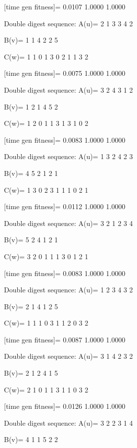 [time gen fitness]=
    0.0107    1.0000    1.0000

Double digest sequence:
A(u)=
     2     1     3     3     4     2

B(v)=
     1     1     4     2     2     5

C(w)=
     1     1     0     1     3     0     2     1     1     3     2

[time gen fitness]=
    0.0075    1.0000    1.0000

Double digest sequence:
A(u)=
     3     2     4     3     1     2

B(v)=
     1     2     1     4     5     2

C(w)=
     1     2     0     1     1     3     1     3     1     0     2

[time gen fitness]=
    0.0083    1.0000    1.0000

Double digest sequence:
A(u)=
     1     3     2     4     2     3

B(v)=
     4     5     2     1     2     1

C(w)=
     1     3     0     2     3     1     1     1     0     2     1

[time gen fitness]=
    0.0112    1.0000    1.0000

Double digest sequence:
A(u)=
     3     2     1     2     3     4

B(v)=
     5     2     4     1     2     1

C(w)=
     3     2     0     1     1     1     3     0     1     2     1

[time gen fitness]=
    0.0083    1.0000    1.0000

Double digest sequence:
A(u)=
     1     2     3     4     3     2

B(v)=
     2     1     4     1     2     5

C(w)=
     1     1     1     0     3     1     1     2     0     3     2

[time gen fitness]=
    0.0087    1.0000    1.0000

Double digest sequence:
A(u)=
     3     1     4     2     3     2

B(v)=
     2     1     2     4     1     5

C(w)=
     2     1     0     1     1     3     1     1     0     3     2

[time gen fitness]=
    0.0126    1.0000    1.0000

Double digest sequence:
A(u)=
     3     2     2     3     1     4

B(v)=
     4     1     1     5     2     2

